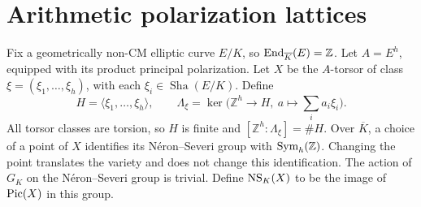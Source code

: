 \documentclass[11pt,a4paper]{article}
\theoremstyle{definition}\newtheorem{definition}[theorem]{Definition}
\theoremstyle{remark}\newtheorem{remark}[theorem]{Remark}
\newcommand{\Sha}{\operatorname{\mathrm{Sha}}}
\newcommand{\ZZ}{\mathbb Z}\newcommand{\QQ}{\mathbb Q}\newcommand{\FF}{\mathbb F}
\numberwithin{equation}{section}
\begin{document}
\section{Arithmetic polarization lattices}
Fix a geometrically non-CM elliptic curve $E/K$, so $\End_{\overline K}(E)=\ZZ$. Let $A=E^h$, equipped with its product principal polarization. Let $X$ be the $A$-torsor of class $\xi=(\xi_1,\ldots,\xi_h)$, with each $\xi_i\in\Sha(E/K)$. Define
\[
H=\langle\xi_1,\ldots,\xi_h\rangle,\qquad
\Lambda_\xi=\ker\bigl(\ZZ^h\longrightarrow H,\ a\longmapsto\textstyle\sum_i a_i\xi_i\bigr).
\]
All torsor classes are torsion, so $H$ is finite and $[\ZZ^h:\Lambda_\xi]=\#H$. Over $\overline K$, a choice of a point of $X$ identifies its N\'{e}ron--Severi group with $\Sym_h(\ZZ)$. Changing the point translates the variety and does not change this identification. The action of $G_K$ on the N\'{e}ron--Severi group is trivial. Define $\operatorname{NS}_K(X)$ to be the image of $\operatorname{Pic}(X)$ in this group.
\end{document}
